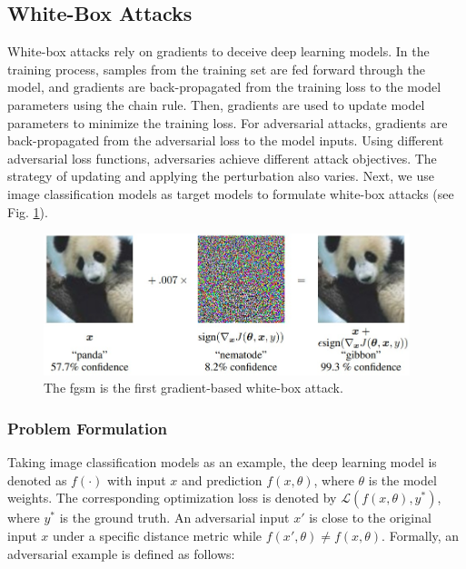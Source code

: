 \subsection{White-Box Attacks}
\label{sec:whitebox_attack}

White-box attacks rely on gradients to deceive deep learning models. In the training process, samples from the training set are fed forward through the model, and gradients are back-propagated from the training loss to the model parameters using the chain rule. Then, gradients are used to update model parameters to minimize the training loss. For adversarial attacks, gradients are back-propagated from the adversarial loss to the model inputs. Using different adversarial loss functions, adversaries achieve different attack objectives. The strategy of updating and applying the perturbation also varies. Next, we use image classification models as target models to formulate white-box attacks (see Fig. \ref{fig.adv_perturb}).

\begin{figure}[H]
\centering
\includegraphics[width=0.95\textwidth]{figures/chapter_intro/fgsm.jpg}
\caption{The \acrfull{fgsm}\citep{goodfellow2015explaining} is the first gradient-based white-box attack.}
\label{fig.adv_perturb}
\end{figure}

\subsubsection{Problem Formulation}

Taking image classification models as an example, the deep learning model is denoted as $f(\cdot)$ with input $x$ and prediction $f(x, \theta)$, where $\theta$ is the model weights. The corresponding optimization loss is denoted by $\mathcal{L}(f(x, \theta), y^*)$, where $y^*$ is the ground truth. An adversarial input $x'$ is close to the original input $x$ under a specific distance metric while $f(x', \theta) \neq f(x, \theta)$. Formally, an adversarial example is defined as follows:

